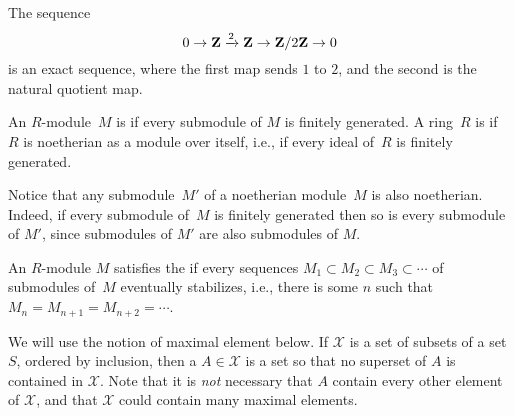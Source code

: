 \begin{example}
The sequence
$$
  0 \to \mathbf{Z} \xrightarrow{2} \mathbf{Z}\rightarrow \mathbf{Z}/2\mathbf{Z} \to 0
$$ 
is an exact sequence, where the first map sends $1$ to $2$, and the second
is the natural quotient map.
\end{example}


\begin{definition}[Noetherian] An $R$-module~$M$ is  if every
submodule of $M$ is finitely generated.  A ring~$R$ is  if~$R$ is
noetherian as a module over itself, i.e., if every ideal of~$R$ is finitely generated.
\end{definition}

Notice that any submodule~$M'$ of a noetherian module~$M$ is also
noetherian.  Indeed, if every submodule of~$M$ is finitely generated
then so is every submodule of $M'$, since submodules of $M'$ are also
submodules of $M$.

\begin{definition}
An $R$-module $M$ satisfies the  if
every sequences $M_1\subset M_2 \subset M_3 \subset \cdots$ of
submodules of~$M$ eventually stabilizes, i.e., there is some $n$ such
that $M_n=M_{n+1}=M_{n+2}=\cdots$.
\end{definition}
We will use the notion of maximal element below.  If $\mathcal{X}$ is
a set of subsets of a set $S$, ordered by inclusion, then a
 $A\in \mathcal{X}$ is a set so that no superset
of $A$ is contained in $\mathcal{X}$.  Note that it is {\em not}
necessary that $A$ contain every other element of $\mathcal{X}$, and
that $\mathcal{X}$ could contain many maximal elements.

